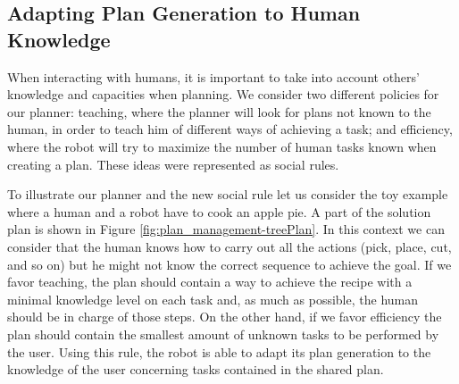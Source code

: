 

\subsection{Adapting Plan Generation to Human Knowledge}
\label{subsec-plan_generation-adapting_knowledge}
When interacting with humans, it is important to take into account others' knowledge and capacities when planning. We consider two different policies for our planner: teaching, where the planner will look for plans not known to the human, in order to teach him of different ways of achieving a task; and efficiency, where the robot will try to maximize the number of human tasks known when creating a plan. These ideas were represented as social rules.

To illustrate our planner and the new social rule let us consider the toy example where a human and a robot have to cook an apple pie. A part of the solution plan is shown in Figure \ref{fig:plan_management-treePlan}. In this context we can consider that the human knows how to carry out all the actions (pick, place, cut, and so on) but he might not know the correct sequence to achieve the goal. If we favor teaching, the plan should contain a way to achieve the recipe with a minimal knowledge level on each task and, as much as possible, the human should be in charge of those steps. On the other hand, if we favor efficiency the plan should contain the smallest amount of unknown tasks to be performed by the user. Using this rule, the robot is able to adapt its plan generation to the knowledge of the user concerning tasks contained in the shared plan.


